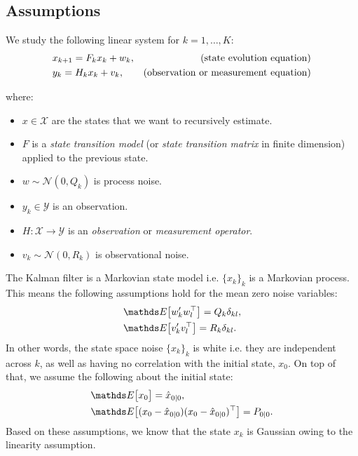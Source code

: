 \subsection{Assumptions}

We study the following linear system for $k=1,\ldots,K$:
\begin{subequations}\label{eq:state_and_observation_equations}
\begin{align}
& x_{k+1} = F_k x_k + w_k, & \text{(state evolution equation)}\label{eq:KalmanState}\\
& y_k = H_k x_k + v_k, & \text{(observation or measurement equation)}\label{eq:KalmanMeasurement}
\end{align}
\end{subequations}

where:
\begin{itemize}
    \item $x\in\mathcal{X}$ are the states that we want to recursively estimate.
    \item $F$ is a \emph{state transition model} (or \emph{state transition matrix} in finite dimension) applied to the previous state.
    \item $w\sim \mathcal{N}(0, Q_k)$ is process noise.
    \item $y_k\in\mathcal{Y}$ is an observation.
    \item $H:\mathcal{X}\rightarrow\mathcal{Y}$ is an \emph{observation} or \emph{measurement operator}.
    \item $v_k\sim \mathcal{N}(0, R_k)$ is observational noise.
\end{itemize}
The Kalman filter is a Markovian state model i.e. $\{ x_k\}_k$ is a Markovian process. This means 
the following assumptions hold for the mean zero noise variables:
\begin{align}
& \expect{w_k' w_l\transp} = Q_k \delta_{kl},\\
& \expect{v_k' v_l\transp} = R_k \delta_{kl}.
\end{align}
In other words, the state space noise $\{ x_k\}_k$ is white i.e. they are independent across $k$, as
well as having no correlation with the initial state, $x_0$. On top of that, we assume the following
about the initial state:
\begin{align}
& \expect{x_0} = \hat{x}_{0|0},\\
& \expect{(x_0-\hat{x}_{0|0})(x_0-\hat{x}_{0|0})\transp} = P_{0|0}.
\end{align}
Based on these assumptions, we know that the state $x_k$ is Gaussian owing to the linearity assumption.

